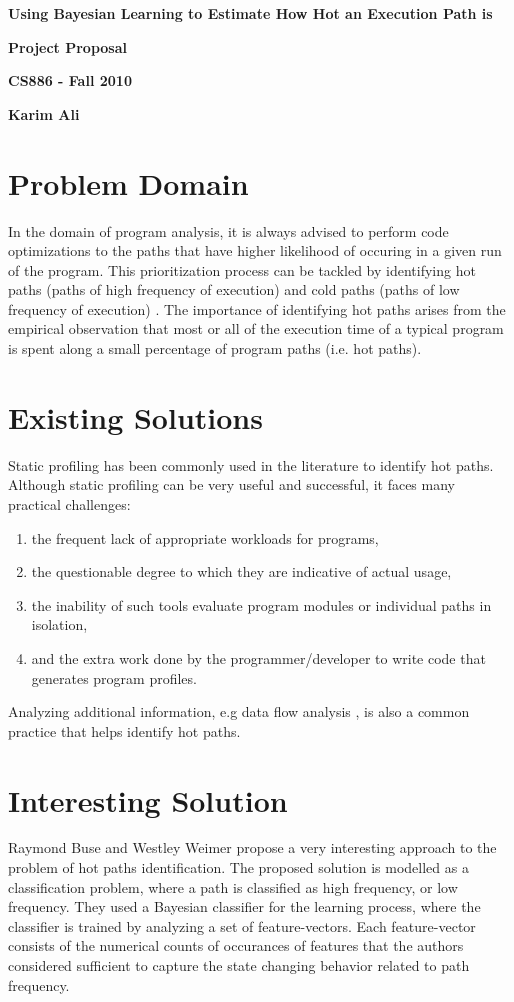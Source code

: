 \documentclass[11pt,a4paper]{article}
\begin{document}
\centerline{\sc \large \textbf{Using Bayesian Learning to Estimate How Hot an Execution Path is}}
\centerline{\textbf{Project Proposal}}
\centerline{\textbf{CS886 - Fall 2010}}
\centerline{\textbf{Karim Ali}}
\vspace{2pc}

\section{Problem Domain}
In the domain of program analysis, it is always advised to perform code optimizations to the paths that have higher likelihood of occuring in a given run of
the program. This prioritization process can be tackled by identifying hot paths (paths of high frequency of execution) and cold paths (paths of low frequency
of execution) \cite{baba2007design, ball1996efficient, duesterwald2000software, merten1999hardware}. The importance of identifying hot paths arises from the
empirical observation that most or all of the execution time of a typical program is spent along a small percentage of program paths (i.e. hot paths).

\section{Existing Solutions}
Static profiling has been commonly used in the literature to identify hot paths. Although static profiling can be very useful and successful, it faces many
practical challenges:
\begin{enumerate}
  \item the frequent lack of appropriate workloads for programs,
  \item the questionable degree to which they are indicative of actual usage,
  \item the inability of such tools evaluate program modules or individual paths in isolation,
  \item and the extra work done by the programmer/developer to write code that generates program profiles.
\end{enumerate}

Analyzing additional information, e.g data flow analysis \cite{boogerd2008use},  is also a common practice that helps identify hot paths.

\section{Interesting Solution}
Raymond Buse and Westley Weimer \cite{buse2009road} propose a very interesting approach to the problem of hot paths identification. The proposed solution is
modelled as a classification problem, where a path is classified as \textsf{high frequency}, or \textsf{low frequency}. They used a Bayesian classifier for the
learning process, where the classifier is trained by analyzing a set of feature-vectors. Each feature-vector consists of the numerical counts of occurances of
features that the authors considered sufficient to capture the state changing behavior related to path frequency.
\end{document}
